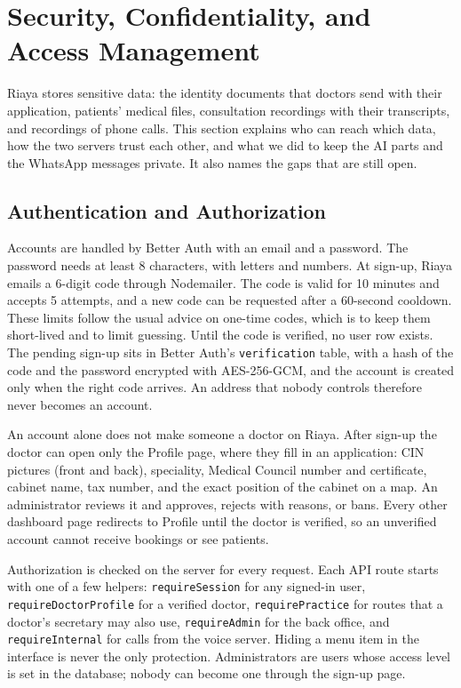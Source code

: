 \section{Security, Confidentiality, and Access Management}\label{sec:security}

Riaya stores sensitive data: the identity documents that doctors send with their application, patients' medical files, consultation recordings with their transcripts, and recordings of phone calls. This section explains who can reach which data, how the two servers trust each other, and what we did to keep the AI parts and the WhatsApp messages private. It also names the gaps that are still open.

\subsection{Authentication and Authorization}

Accounts are handled by Better Auth with an email and a password. The password needs at least 8 characters, with letters and numbers. At sign-up, Riaya emails a 6-digit code through Nodemailer. The code is valid for 10 minutes and accepts 5 attempts, and a new code can be requested after a 60-second cooldown. These limits follow the usual advice on one-time codes, which is to keep them short-lived and to limit guessing. Until the code is verified, no user row exists. The pending sign-up sits in Better Auth's \texttt{verification} table, with a hash of the code and the password encrypted with AES-256-GCM, and the account is created only when the right code arrives. An address that nobody controls therefore never becomes an account.

An account alone does not make someone a doctor on Riaya. After sign-up the doctor can open only the Profile page, where they fill in an application: CIN pictures (front and back), speciality, Medical Council number and certificate, cabinet name, tax number, and the exact position of the cabinet on a map. An administrator reviews it and approves, rejects with reasons, or bans. Every other dashboard page redirects to Profile until the doctor is verified, so an unverified account cannot receive bookings or see patients.

Authorization is checked on the server for every request. Each API route starts with one of a few helpers: \texttt{requireSession} for any signed-in user, \texttt{requireDoctorProfile} for a verified doctor, \texttt{requirePractice} for routes that a doctor's secretary may also use, \texttt{requireAdmin} for the back office, and \texttt{requireInternal} for calls from the voice server. Hiding a menu item in the interface is never the only protection. Administrators are users whose access level is set in the database; nobody can become one through the sign-up page.

